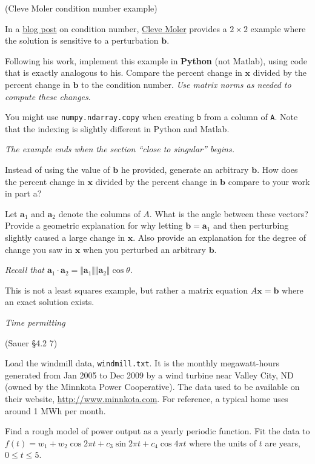 \documentclass[12pt,letterpaper,noanswers]{exam}
\newcommand{\vc}[1]{\boldsymbol{#1}}
\begin{document}
\begin{questions}
\question (Cleve Moler condition number example)

In a \href{https://blogs.mathworks.com/cleve/2017/07/17/what-is-the-condition-number-of-a-matrix/}{blog post} on condition number, \href{https://en.wikipedia.org/wiki/Cleve_Moler}{Cleve Moler} provides a $2\times 2$ example where the solution is sensitive to a perturbation $\vc{b}$.

\begin{parts}
\item Following his work, implement this example in \textbf{Python} (not Matlab), using code that is exactly analogous to his.  Compare the percent change in $\vc{x}$ divided by the percent change in $\vc{b}$ to the condition number.  \emph{Use matrix norms as needed to compute these changes}.

You might use \texttt{numpy.ndarray.copy} when creating \texttt{b} from a column of \texttt{A}.  Note that the indexing is slightly different in Python and Matlab.

\emph{The example ends when the section ``close to singular'' begins.}

\item Instead of using the value of $\vc{b}$ he provided, generate an arbitrary $\vc{b}$.  How does the percent change in $\vc{x}$ divided by the percent change in $\vc{b}$ compare to your work in part a?

\item Let $\vc{a}_1$ and $\vc{a}_2$ denote the columns of $A$.  What is the angle between these vectors?  Provide a geometric explanation for why letting $\vc{b} = \vc{a}_1$ and then perturbing slightly caused a large change in $\vc{x}$.  Also provide an explanation for the degree of change you saw in $\vc{x}$ when you perturbed an arbitrary $\vc{b}$.

\emph{Recall that $\vc{a}_1\cdot\vc{a}_2 = \Vert \vc{a}_1\Vert\Vert\vc{a}_2\Vert\cos\theta$.}
\end{parts}



This is not a least squares example, but rather a matrix equation $A\vc{x} = \vc{b}$ where an exact solution exists.


\question \emph{Time permitting} 

(Sauer \S4.2 7)

Load the windmill data, \texttt{windmill.txt}.  It is the monthly megawatt-hours generated from Jan 2005 to Dec 2009 by a wind turbine near Valley City, ND (owned by the Minnkota Power Cooperative).  The data used to be available on their website, \url{http://www.minnkota.com}.  For reference, a typical home uses around 1 MWh per month.
\begin{parts}
\item Find a rough model of power output as a yearly periodic function.  Fit the data to $f(t) = w_1 + w_2\cos 2\pi t + c_3 \sin 2\pi t + c_4 \cos 4 \pi t$ where the units of $t$ are years, $0\leq t\leq 5$.


\end{parts}
\end{questions}
\end{document}
